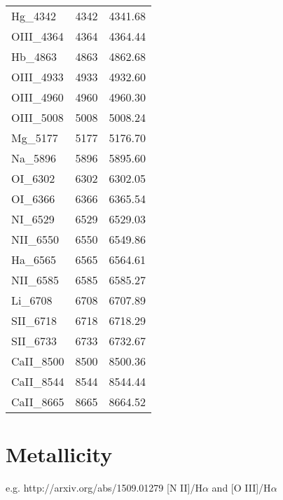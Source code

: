 \documentclass[11pt]{article}
\begin{document}
\begin{table}
\begin{center}
\begin{tabular}{lll}
Hg\_4342    &   4342 &	4341.68 \\
OIII\_4364  &	4364 &	4364.44 \\
Hb\_4863    &   4863 &  4862.68 \\
OIII\_4933  &	4933 &	4932.60 \\
OIII\_4960  &	4960 &  4960.30 \\
OIII\_5008  &	5008 &  5008.24 \\
Mg\_5177    &   5177 &	5176.70 \\
Na\_5896    &   5896 &	5895.60 \\
OI\_6302    &   6302 &	6302.05 \\
OI\_6366    &   6366 &	6365.54 \\
NI\_6529    &   6529 &	6529.03 \\
NII\_6550   &	6550 &	6549.86 \\
Ha\_6565    &   6565 &	6564.61 \\
NII\_6585   &	6585 &	6585.27 \\
Li\_6708    &   6708 &	6707.89 \\
SII\_6718   &	6718 &	6718.29 \\
SII\_6733   &	6733 &	6732.67 \\
CaII\_8500  &   8500 &	8500.36 \\
CaII\_8544  &	8544 &	8544.44 \\
CaII\_8665  &	8665 &	8664.52 \\
      \hline
      \hline
 \end{tabular}
   \end{center}
\end{table}



\section{Metallicity}
e.g. http://arxiv.org/abs/1509.01279
[N II]/H$\alpha$ and [O III]/H$\alpha$
\end{document}
